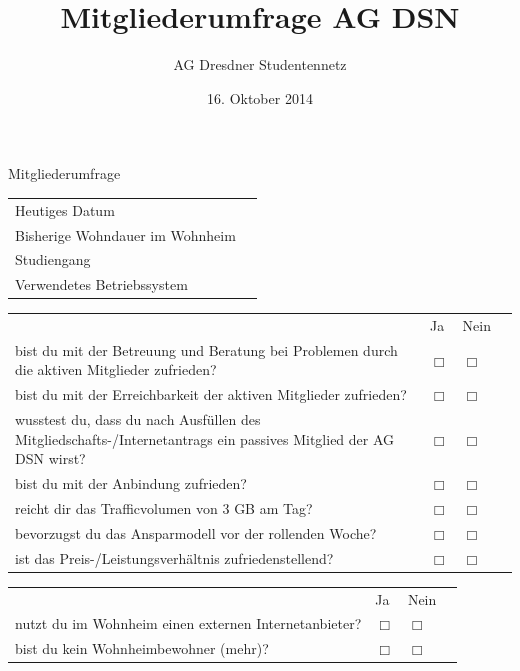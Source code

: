 \documentclass[a4paper,10pt]{scrreprt}
\title{Mitgliederumfrage AG DSN}
\author{AG Dresdner Studentennetz}
\date{16. Oktober 2014}
\renewcommand{\vertikalblocktwo}[3]{\vspace{0.1cm}\begin{tabular}{p{10cm}p{2cm}p{2cm}p{0.001cm}}&\centering #1&\centering #2&\\#3\end{tabular}\vspace{0.5cm}}
\renewcommand{\blocktexttwo}[1]{#1\vspace{0.2cm}& \centering$\Box$ & \centering$\Box$&\\}
\renewcommand{\longline}{\raisebox{-3mm}{\parbox{8cm}{\hrule\strut}}}
\renewenvironment{answersA}{\vspace{0.25cm}\begin{addmargin}[0cm]{4cm}\begin{compactitem}[]}{\end{compactitem}\end{addmargin}}
\begin{document}
    \thispagestyle{fancy}
    \renewcommand{\headrulewidth}{0pt}
    \renewcommand{\footrulewidth}{0pt}
    \setlength\headheight{40.0pt}
    \addtolength{\textheight}{-70.0pt}
    \cfoot{}

    {\huge Mitgliederumfrage}

    \begin{answersA}
        \item{}
        \item{}
        \item{}
        \item{}
        \item{}\vspace{.25cm}
        \item{}
    \end{answersA}

    \begin{tabular}{ p{6cm} l }
        Heutiges Datum & \longline \\
        Bisherige Wohndauer im Wohnheim & \longline \\
        Studiengang & \longline \\
        Verwendetes Betriebssystem & \longline
    \end{tabular}

    \vertikalblocktwo{Ja}{Nein}{
        \blocktexttwo{bist du mit der Betreuung und Beratung bei Problemen durch die aktiven Mitglieder zufrieden?}
        \blocktexttwo{bist du mit der Erreichbarkeit der aktiven Mitglieder zufrieden?}
        \blocktexttwo{wusstest du, dass du nach Ausfüllen des
        Mitgliedschafts-/Internetantrags ein passives Mitglied der AG DSN wirst?}
        \blocktexttwo{bist du mit der Anbindung zufrieden?}
        \blocktexttwo{reicht dir das Trafficvolumen von 3 GB am Tag?}
        \blocktexttwo{bevorzugst du das Ansparmodell vor der rollenden Woche?}
        \blocktexttwo{ist das Preis-/Leistungsverhältnis zufriedenstellend?}
    }

    \vertikalblocktwo{Ja}{Nein}{
        \blocktexttwo{nutzt du im Wohnheim einen externen Internetanbieter?}
        \blocktexttwo{bist du kein Wohnheimbewohner (mehr)?}
    }

    \opentwo
\end{document}
